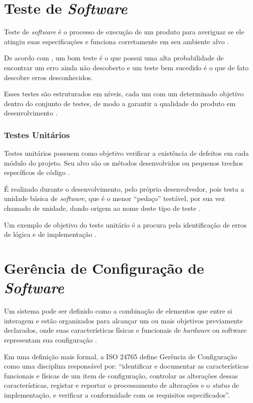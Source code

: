 \section{Teste de \textit{Software}}
Teste de \textit{software} é o processo de execução de um produto para averiguar se ele atingiu suas especificações e funciona corretamente em seu ambiente alvo \cite{artigo_intro_teste}.

De acordo com , um bom teste é o que possui uma alta probabilidade de encontrar um erro ainda não descoberto e um teste bem sucedido é o que de fato descobre erros desconhecidos.

Esses testes são estruturados em níveis, cada um com um determinado objetivo dentro do conjunto de testes, de modo a garantir a qualidade do produto em desenvolvimento \cite{sw_test_tech}.

    \subsubsection{Testes Unitários}
    Testes unitários possuem como objetivo verificar a existência de defeitos em cada módulo do projeto. Seu alvo são os métodos desenvolvidos ou pequenos trechos específicos de código \cite{artigo_intro_teste}.

    É realizado durante o desenvolvimento, pelo próprio desenvolvedor, pois testa a unidade básica de \textit{software}, que é o menor ``pedaço''  testável, por sua vez chamado de unidade, dando origem ao nome deste tipo de teste \cite{sw_test_tech}.

    Um exemplo de objetivo do teste unitário é a procura pela identificação de erros de lógica e de implementação \cite{maldonado}.

\section{Gerência de Configuração de \textit{Software}}
Um sistema pode ser definido como a combinação de elementos que entre si interagem e estão organizados para alcançar um ou mais objetivos previamente declarados, onde suas características físicas e funcionais de \textit{hardware} ou software representam sua configuração \cite{SWEBOK2014}.

Em uma definição mais formal, a ISO 24765 \cite{iso_24765} define Gerência de Configuração como uma disciplina responsável por: ``identificar e documentar as características funcionais e físicas de um item de configuração, controlar as alterações dessas características, registar e reportar o processamento de alterações e o \textit{status} de implementação, e verificar a conformidade com os requisitos especificados''.

